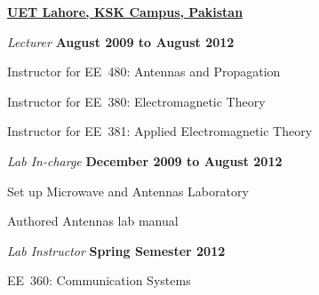 \documentclass[10pt]{article}
\begin{document}
\href{http://www.uet.edu.pk/}{\textbf{UET Lahore, KSK Campus, Pakistan}}
\begin{outerlist}

\item[] \textit{Lecturer}%
    \hfill \textbf{August 2009 to August 2012}
    \begin{innerlist}
        \item[] Instructor for EE~480: Antennas and Propagation
        \item[] Instructor for EE~380: Electromagnetic Theory
        \item[] Instructor for EE~381: Applied Electromagnetic Theory
    \end{innerlist}

\item[] \textit{Lab In-charge}
    \hfill \textbf{December 2009 to August 2012}
    \begin{innerlist}
        \item[] Set up Microwave and Antennas Laboratory
        \item[] Authored Antennas lab manual
        \end{innerlist}

\item[] \textit{Lab Instructor}
\hfill \textbf{Spring Semester 2012}
    \begin{innerlist}
        \item[] EE~360: Communication Systems
    \end{innerlist}
\end{outerlist}

\end{document}
